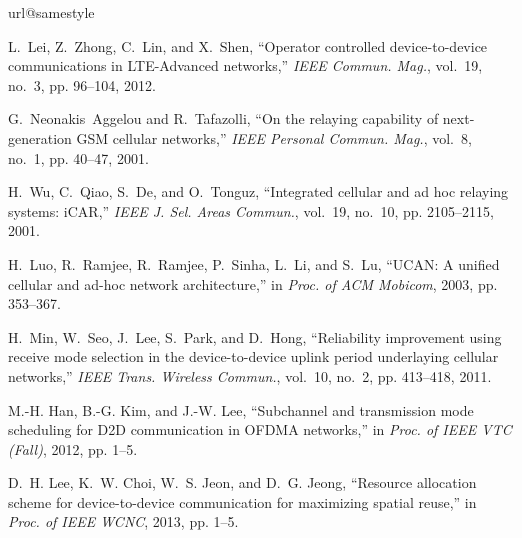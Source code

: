 \documentclass[journal, 10pt]{IEEEtran}
\begin{document}
\begin{thebibliography}{10}
\providecommand{\url}[1]{#1}
\csname url@samestyle\endcsname
\providecommand{\newblock}{\relax}
\providecommand{\bibinfo}[2]{#2}
\providecommand{\BIBentrySTDinterwordspacing}{\spaceskip=0pt\relax}
\providecommand{\BIBentryALTinterwordstretchfactor}{4}
\providecommand{\BIBentryALTinterwordspacing}{\spaceskip=\fontdimen2\font plus
\BIBentryALTinterwordstretchfactor\fontdimen3\font minus
  \fontdimen4\font\relax}
\providecommand{\BIBforeignlanguage}[2]{{\expandafter\ifx\csname l@#1\endcsname\relax
\typeout{** WARNING: IEEEtran.bst: No hyphenation pattern has been}\typeout{** loaded for the language `#1'. Using the pattern for}\typeout{** the default language instead.}\else
\language=\csname l@#1\endcsname
\fi
#2}}
\providecommand{\BIBdecl}{\relax}
\BIBdecl

L.~Lei, Z.~Zhong, C.~Lin, and X.~Shen, ``Operator controlled device-to-device
  communications in {LTE-Advanced} networks,'' \emph{{IEEE} Commun. Mag.},
  vol.~19, no.~3, pp. 96--104, 2012.

G.~Neonakis~Aggelou and R.~Tafazolli, ``On the relaying capability of
  next-generation {GSM} cellular networks,'' \emph{{IEEE} Personal Commun.
  Mag.}, vol.~8, no.~1, pp. 40--47, 2001.

H.~Wu, C.~Qiao, S.~De, and O.~Tonguz, ``Integrated cellular and ad hoc relaying
  systems: {iCAR},'' \emph{{IEEE} J. Sel. Areas Commun.}, vol.~19, no.~10, pp.
  2105--2115, 2001.

H.~Luo, R.~Ramjee, R.~Ramjee, P.~Sinha, L.~Li, and S.~Lu, ``{UCAN}: A unified
  cellular and ad-hoc network architecture,'' in \emph{Proc. of ACM Mobicom},
  2003, pp. 353--367.

H.~Min, W.~Seo, J.~Lee, S.~Park, and D.~Hong, ``Reliability improvement using
  receive mode selection in the device-to-device uplink period underlaying
  cellular networks,'' \emph{{IEEE} Trans. Wireless Commun.}, vol.~10, no.~2,
  pp. 413--418, 2011.

M.-H. Han, B.-G. Kim, and J.-W. Lee, ``Subchannel and transmission mode
  scheduling for {D2D} communication in {OFDMA} networks,'' in \emph{Proc. of
  IEEE VTC (Fall)}, 2012, pp. 1--5.

D.~H. Lee, K.~W. Choi, W.~S. Jeon, and D.~G. Jeong, ``Resource allocation
  scheme for device-to-device communication for maximizing spatial reuse,'' in
  \emph{Proc. of IEEE WCNC}, 2013, pp. 1--5.


\end{thebibliography}
\end{document}
